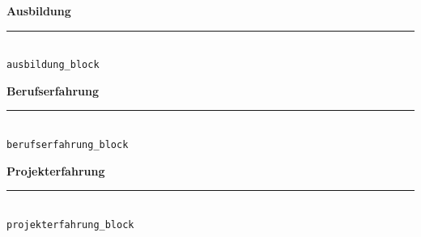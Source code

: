 \documentclass[a4paper,10pt]{article}
\newcommand{\VAR}[1]{\texttt{#1}}
\newcommand{\sectiontitle}[1]{%
  {\Large\color{primarycolor}\textbf{#1}}\\[2mm]
  \textcolor{lightgray}{\rule{\linewidth}{1pt}}\\[4mm]
}
\begin{document}
\hspace{0.04\textwidth} %
\begin{minipage}[t]{0.64\textwidth} %

    \sectiontitle{Ausbildung}
    \VAR{ausbildung_block}

    \sectiontitle{Berufserfahrung}
    \VAR{berufserfahrung_block}

    \sectiontitle{Projekterfahrung}
    \VAR{projekterfahrung_block}

\end{minipage}
\end{document}
